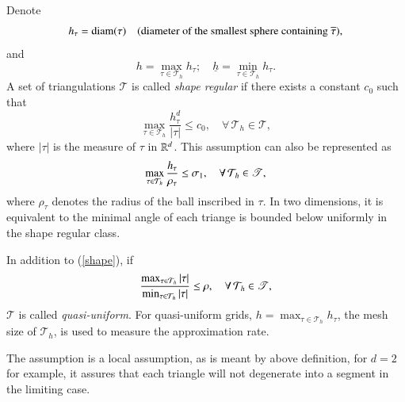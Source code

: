Denote 
$$
h_\tau=\mbox{\rm diam} (\tau)\quad  \hbox{(diameter of the smallest sphere containing $\overline{\tau}$)},
$$
and 
$$
 h=\max_{\tau\in\mathcal T_h} h_\tau;\quad
\underline{h}=\min_{\tau\in\mathcal T_h} h_\tau.
$$
A set of triangulations $\mathscr T$ is called {\em shape regular} if
there exists a constant $c_0$ such that
\begin{equation}\label{shape} \max _{\tau \in \mathcal T_h} \frac{h_{\tau}^d}{|\tau|}\leq c_0, \quad \forall \, \mathcal T_h\in
\mathscr T,
\end{equation} 
where $|\tau|$ is the measure of $\tau$ in $\mathbb R^d$. This assumption can also be represented as
\begin{equation}\Label{A3.1}
\max_{\tau\in\ct_h}\frac{h_\tau}{\rho_\tau}\le\sigma_1,\quad \forall \, \mathcal T_h\in
\mathscr T,
\end{equation}
where $\rho_\tau$\index{$\rho_\tau$} denotes the radius of the ball
inscribed in $\tau$. In two dimensions, it is equivalent
to the minimal angle of each triange is bounded below uniformly
in the shape regular class. 

In addition to (\ref{shape}), if
\begin{equation}\Label{A3.2}
  \frac{\max _{\tau \in \mathcal T_h}|\tau|}{\min _{\tau \in \mathcal T_h}|\tau|} \leq \rho,\quad \forall \, \mathcal T_h\in \mathscr T,
\end{equation}
$\mathscr T$ is called {\em quasi-uniform}. For quasi-uniform grids,
$h=\max _{\tau \in \mathcal T_h} h_{\tau}$, the mesh size of
$\mathcal T_h$, is used to measure the approximation rate. 


The assumption  is a local assumption, as is meant by above
definition, for $d=2$ for example, it assures that each triangle will
not degenerate into a segment in the limiting case.  

